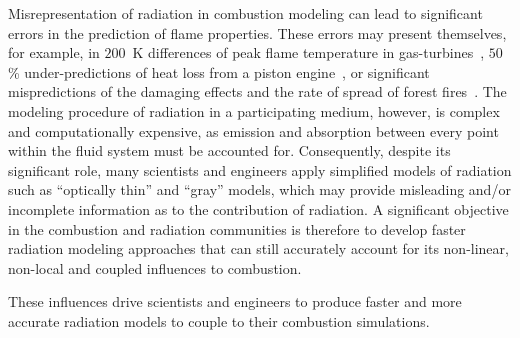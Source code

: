 Misrepresentation of radiation in combustion modeling can lead to significant errors in the prediction of flame properties. These errors may present themselves, for example, in $200$~K differences of peak flame temperature in gas-turbines~\cite{Gamil2020AssessmentChamber}, $50$\% under-predictions of heat loss from a piston engine~\cite{Modest2016RadiativeSystems}, or significant mispredictions of the damaging effects and the rate of spread of forest fires~\cite{Valendik2008EffectEnvironment}. 
The modeling procedure of radiation in a participating medium, however, is complex and computationally expensive, as emission and absorption between every point within the fluid system must be accounted for. Consequently, despite its significant role, many scientists and engineers apply simplified models of radiation such as “optically thin” and “gray” models, which may provide misleading and/or incomplete information as to the contribution of radiation. 
A significant objective in the combustion and radiation communities is therefore to develop faster radiation modeling approaches that can still accurately account for its non-linear, non-local and coupled influences to combustion.







These influences drive scientists and engineers to produce faster and more accurate radiation models to couple to their combustion simulations.






